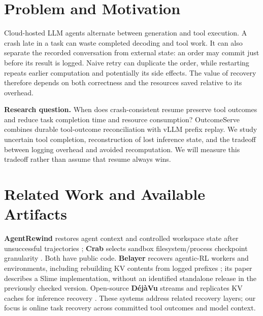 \documentclass{article}
\begin{document}
\printAffiliationsAndNotice{}

\section{Problem and Motivation}
Cloud-hosted LLM agents alternate between generation and tool execution. A crash late in a task can waste completed decoding and tool work. It can also separate the recorded conversation from external state: an order may commit just before its result is logged. Naive retry can duplicate the order, while restarting repeats earlier computation and potentially its side effects. The value of recovery therefore depends on both correctness and the resources saved relative to its overhead.

\textbf{Research question.} When does crash-consistent resume preserve tool outcomes and reduce task completion time and resource consumption? OutcomeServe combines durable tool-outcome reconciliation with vLLM prefix replay. We study uncertain tool completion, reconstruction of lost inference state, and the tradeoff between logging overhead and avoided recomputation. We will measure this tradeoff rather than assume that resume always wins.

\section{Related Work and Available Artifacts}
\textbf{AgentRewind} restores agent context and controlled workspace state after unsuccessful trajectories \cite{agentrewind}; \textbf{Crab} selects sandbox filesystem/process checkpoint granularity \cite{crab}. Both have public code. \textbf{Belayer} recovers agentic-RL workers and environments, including rebuilding KV contents from logged prefixes \cite{belayer}; its paper describes a Slime implementation, without an identified standalone release in the previously checked version. Open-source \textbf{D\'ej\`aVu} streams and replicates KV caches for inference recovery \cite{dejavu}. These systems address related recovery layers; our focus is online task recovery across committed tool outcomes and model context.
\end{document}
